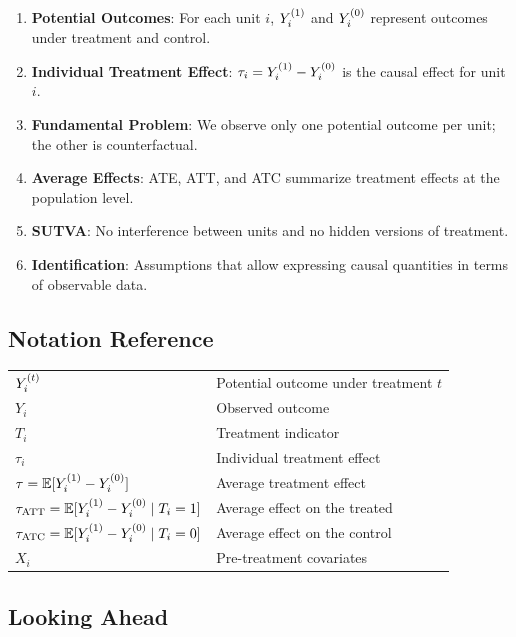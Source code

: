 \begin{enumerate}
    \item \textbf{Potential Outcomes}: For each unit $i$, $Y^{(1)}_i$ and $Y^{(0)}_i$ represent outcomes under treatment and control.

    \item \textbf{Individual Treatment Effect}: $\tau_i = Y^{(1)}_i - Y^{(0)}_i$ is the causal effect for unit $i$.

    \item \textbf{Fundamental Problem}: We observe only one potential outcome per unit; the other is counterfactual.

    \item \textbf{Average Effects}: ATE, ATT, and ATC summarize treatment effects at the population level.

    \item \textbf{SUTVA}: No interference between units and no hidden versions of treatment.

    \item \textbf{Identification}: Assumptions that allow expressing causal quantities in terms of observable data.
\end{enumerate}

\subsection{Notation Reference}

\begin{center}
\begin{tabular}{ll}
$Y^{(t)}_i$ & Potential outcome under treatment $t$ \\
$Y_i$ & Observed outcome \\
$T_i$ & Treatment indicator \\
$\tau_i$ & Individual treatment effect \\
$\tau = \mathbb{E}[Y^{(1)}_i - Y^{(0)}_i]$ & Average treatment effect \\
$\tau_{\text{ATT}} = \mathbb{E}[Y^{(1)}_i - Y^{(0)}_i \mid T_i = 1]$ & Average effect on the treated \\
$\tau_{\text{ATC}} = \mathbb{E}[Y^{(1)}_i - Y^{(0)}_i \mid T_i = 0]$ & Average effect on the control \\
$X_i$ & Pre-treatment covariates
\end{tabular}
\end{center}

\subsection{Looking Ahead}

